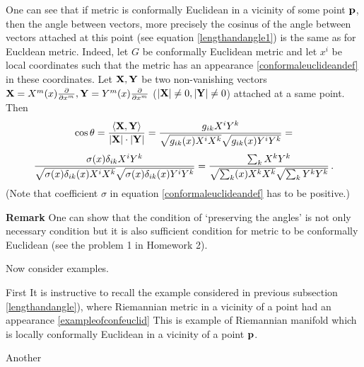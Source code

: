 \documentclass[12pt]{article}
\theoremstyle{theorem}
\numberwithin{equation}{section}
\begin{document}
\m

 
 One can see that  if metric is
 conformally Euclidean in a vicinity of some point ${\bf p}$,
then
 the angle between vectors, more precisely the 
cosinus of the angle between vectors  attached at this point
(see equation \eqref{lengthandangle1})
 is the same as for Eucldean metric.
Indeed, let $G$ be conformally Euclidean metric and let
 $x^i$ be local coordinates such that the metric has
an appearance \eqref{conformaleuclideandef} in these coordinates.
Let ${\bf X},{\bf Y}$ be two non-vanishing vectors 
 ${\bf X}=X^m(x){\partial \over \partial x^m}, {\bf Y}=Y^m(x){\partial\over \partial x^m}$
  ($|{\bf X}|\not=0,|{\bf Y}|\not=0$) attached at a same point.
  Then
                $$
 \cos\theta=
{{\langle {\bf X},{\bf Y}\rangle}\over |{\bf X}|\cdot|{\bf Y}|}=
{g_{ik}X^iY^k\over \sqrt {g_{ik}(x)X^iX^k}
    \sqrt {g_{ik}(x)Y^iY^k}}=
                         $$
         \begin{equation}\label{scalarproductforconformal}
{\sigma(x)\delta_{ik}X^iY^k\over \sqrt {\sigma(x)\delta_{ik}(x)X^iX^k}
    \sqrt {\sigma(x)\delta_{ik}(x)Y^iY^k}}=
{\sum_kX^kY^k\over \sqrt {\sum_k(x)X^kX^k}
    \sqrt {\sum_kY^kY^k}}\,.
                                  \end{equation}
(Note that coefficient $\sigma$ in equation
\eqref{conformaleuclideandef}  has to be positive.)

{\bf Remark}  One can show that the condition of 
`preserving the angles' is not only necessary condition but
it is also sufficient condition for metric
to be conformally Euclidean (see the problem 1 in Homework 2).

Now   consider examples.

\smallskip
  First It is instructive to recall the example    
considered in previous subsection \ref{lengthandangle}),
where Riemannian metric in a vicinity of a point
had an appearance \eqref{exampleofconfeuclid}
This is example of Riemannian manifold which is
locally conformally Euclidean in a vicinity of a point
${\bf p}$. 

\smallskip

   Another 
\end{document}
